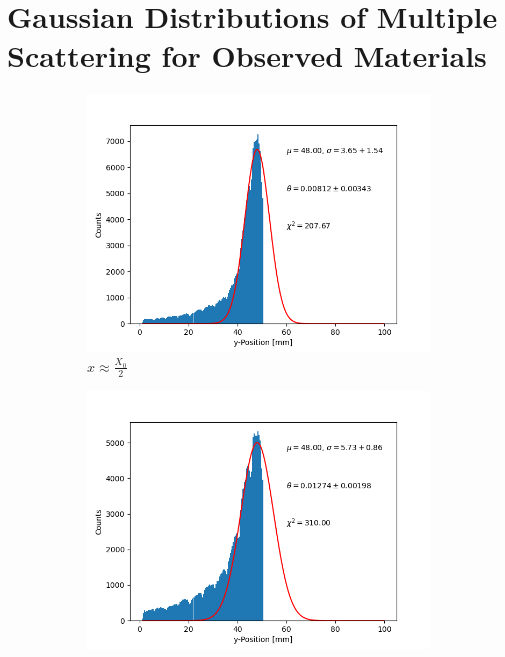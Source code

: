 \documentclass[sn-mathphys-num,iicol]{sn-jnl}
\theoremstyle{thmstyleone}
\theoremstyle{thmstyletwo}
\theoremstyle{thmstylethree}
\begin{document}
\clearpage
\section{Gaussian Distributions of Multiple Scattering for Observed Materials}
\renewcommand{\thefigure}{\Alph{section}\arabic{figure}}
\setcounter{figure}{0}
\renewcommand{\thetable}{\Alph{section}\arabic{table}}
\setcounter{table}{0}


\begin{figure}[h]
    \centering
    \begin{subfigure}{0.49\textwidth}
        \includegraphics[width=\textwidth]{../src/elsa/finished_plots/Aluminium, Half Radiation Length, 40cm Distance.png}
        \caption{$x\approx\frac{X_0}{2}$}
    \end{subfigure}
    \begin{subfigure}{0.49\textwidth}
        \includegraphics[width=\textwidth]{../src/elsa/finished_plots/Aluminium, One Radiation Length, 40cm Distance.png}

\end{subfigure}
\end{figure}
\end{document}
